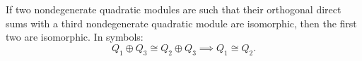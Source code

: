 If two nondegenerate quadratic modules are such that their orthogonal direct sums with a third nondegenerate quadratic module are isomorphic, then the first two are isomorphic. In symbols:
$$Q_1 \oplus Q_3 \cong Q_2 \oplus Q_3 \implies Q_1 \cong Q_2.$$
